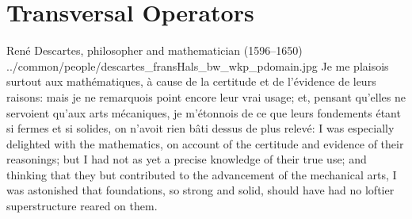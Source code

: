 ﻿%


\chapter{Transversal Operators}

\qboxnpqt
  {Ren\'e Descartes, philosopher and mathematician (1596--1650)
   \footnotemark}
  {../common/people/descartes_fransHals_bw_wkp_pdomain.jpg}
  {Je me plaisois surtout aux math\'ematiques,
    \`a cause de la certitude et de l'\'evidence de leurs raisons:
    mais je ne remarquois point encore leur vrai usage;
    et, pensant qu'elles ne servoient qu'aux arts m\'ecaniques,
    je m'\'etonnois de ce que leurs fondements \'etant si fermes et si solides,
    on n'avoit rien b\^ati dessus de plus relev\'e:}
  {I was especially delighted with the mathematics,
    on account of the certitude and evidence of their reasonings;
    but I had not as yet a precise knowledge of their true use;
    and thinking that they but contributed to the advancement of the mechanical arts,
    I was astonished that foundations, so strong and solid,
    should have had no loftier superstructure reared on them.}

%
%

